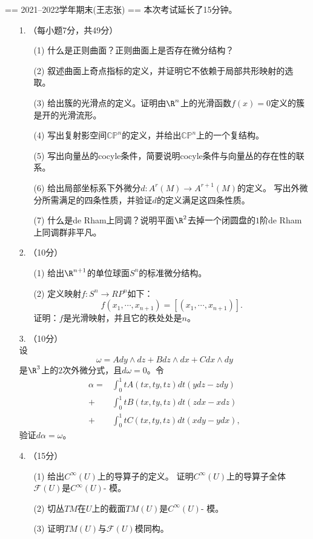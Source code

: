 == 2021--2022学年期末(王志张) ==
\qquad 本次考试延长了15分钟。
\begin{itemize}
    \item[1.]
    （每小题7分，共49分）
    \begin{enumerate}
        \item[(1)]
        什么是正则曲面？正则曲面上是否存在微分结构？
        \item[(2)]
        叙述曲面上奇点指标的定义，并证明它不依赖于局部共形映射的选取。
        \item[(3)]
        给出簇的光滑点的定义。证明由$\R^n$上的光滑函数$f(x)=0$定义的簇是开的光滑流形。
        \item[(4)]
        写出复射影空间$\mathbb{CP}^n$的定义，并给出$\mathbb{CP}^n$上的一个复结构。
        \item[(5)]
        写出向量丛的cocyle条件，简要说明cocyle条件与向量丛的存在性的联系。
        \item[(6)]
        给出局部坐标系下外微分$d:A^r(M)\rightarrow A^{r+1}(M)$的定义。
        写出外微分所需满足的四条性质，并验证$d$的定义满足这四条性质。
        \item[(7)]
        什么是de Rham上同调？说明平面$\R^2$去掉一个闭圆盘的$1$阶de Rham上同调群非平凡。
    \end{enumerate}
    
    \item[2.]
    （10分）
    \begin{enumerate}
        \item[(1)]给出$\R^{n+1}$的单位球面$S^n$的标准微分结构。
        \item[(2)]定义映射$f:S^n\rightarrow RP^n$如下：
        \[f(x_1,\cdots,x_{n+1})=[(x_1,\cdots,x_{n+1})].\]
    证明：$f$是光滑映射，并且它的秩处处是$n$。
    \end{enumerate}

    \item[3.]
    （10分）\\
    设
    \[\omega=Ady\wedge dz+Bdz\wedge dx+Cdx\wedge dy\]
    是$\R^3$上的$2$次外微分式，且$d\omega=0$。令
    \begin{align*}
        \alpha=&\int_0^1tA(tx,ty,tz)dt(ydz-zdy)\\
        +&\int_0^1tB(tx,ty,tz)dt(zdx-xdz)\\
        +&\int_0^1tC(tx,ty,tz)dt(xdy-ydx),
    \end{align*}
    验证$d\alpha=\omega$。
    
    \item[4.]
    （15分）
    \begin{enumerate}
        \item[(1)]
        给出$C^\infty(U)$上的导算子的定义。
        证明$C^\infty(U)$上的导算子全体$\mathcal{F}(U)$是$C^\infty(U)$- 模。
        \item[(2)]
        切丛$TM$在$U$上的截面$TM(U)$是$C^\infty(U)$- 模。
        \item[(3)]
        证明$TM(U)$与$\mathcal{F}(U)$模同构。
    \end{enumerate}


\end{itemize}
